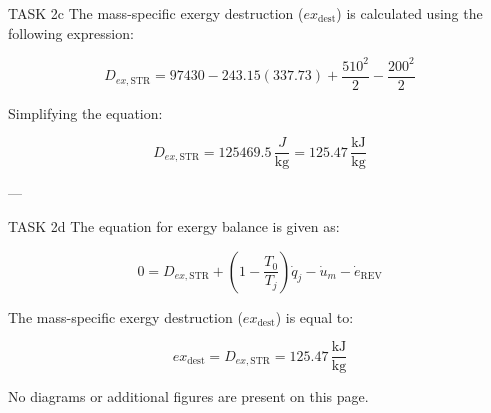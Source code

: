 TASK 2c  
The mass-specific exergy destruction (\( ex_{\text{dest}} \)) is calculated using the following expression:  

\[
D_{ex,\text{STR}} = 97430 - 243.15 (337.73) + \frac{510^2}{2} - \frac{200^2}{2}
\]

Simplifying the equation:  

\[
D_{ex,\text{STR}} = 125469.5 \, \frac{J}{\text{kg}} = 125.47 \, \frac{\text{kJ}}{\text{kg}}
\]

---

TASK 2d  
The equation for exergy balance is given as:  

\[
0 = D_{ex,\text{STR}} + \left( 1 - \frac{T_0}{T_j} \right) \dot{q}_j - \dot{u}_m - \dot{e}_{\text{REV}}
\]

The mass-specific exergy destruction (\( ex_{\text{dest}} \)) is equal to:  

\[
ex_{\text{dest}} = D_{ex,\text{STR}} = 125.47 \, \frac{\text{kJ}}{\text{kg}}
\]  

No diagrams or additional figures are present on this page.